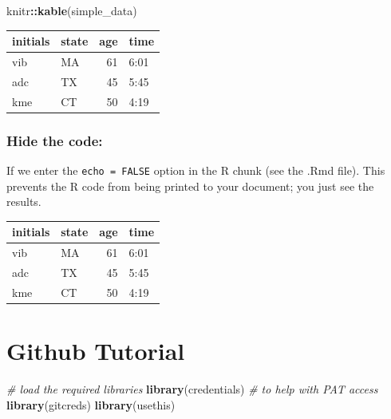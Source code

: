 \documentclass[
]{book}
\newenvironment{Shaded}{\begin{snugshade}}{\end{snugshade}}
\newcommand{\CommentTok}[1]{\textcolor[rgb]{0.56,0.35,0.01}{\textit{#1}}}
\newcommand{\FunctionTok}[1]{\textcolor[rgb]{0.13,0.29,0.53}{\textbf{#1}}}
\newcommand{\NormalTok}[1]{#1}
\newcommand{\SpecialCharTok}[1]{\textcolor[rgb]{0.81,0.36,0.00}{\textbf{#1}}}
\begin{document}
\begin{Shaded}
\begin{Highlighting}[]
\NormalTok{knitr}\SpecialCharTok{::}\FunctionTok{kable}\NormalTok{(simple\_data)}
\end{Highlighting}
\end{Shaded}

\begin{tabular}{l|l|r|l}
\hline
initials & state & age & time\\
\hline
vib & MA & 61 & 6:01\\
\hline
adc & TX & 45 & 5:45\\
\hline
kme & CT & 50 & 4:19\\
\hline
\end{tabular}

\hypertarget{hide-the-code}{%
\subsection{Hide the code:}\label{hide-the-code}}

If we enter the \texttt{echo\ =\ FALSE} option in the R chunk (see the .Rmd file). This prevents the R code from being printed to your document; you just see the results.

\begin{tabular}{l|l|r|l}
\hline
initials & state & age & time\\
\hline
vib & MA & 61 & 6:01\\
\hline
adc & TX & 45 & 5:45\\
\hline
kme & CT & 50 & 4:19\\
\hline
\end{tabular}

\hypertarget{github-tutorial}{%
\chapter{Github Tutorial}\label{github-tutorial}}

\begin{Shaded}
\begin{Highlighting}[]
\CommentTok{\# load the required libraries}
\FunctionTok{library}\NormalTok{(credentials) }\CommentTok{\# to help with PAT access}
\FunctionTok{library}\NormalTok{(gitcreds)}
\FunctionTok{library}\NormalTok{(usethis)}
\end{Highlighting}
\end{Shaded}
\end{document}
